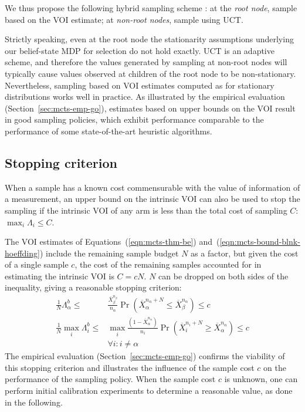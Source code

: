We thus propose the following hybrid sampling scheme \cite{TolpinShimony.mcts}: 
	at the \emph{root node}, sample based on the VOI estimate;
	at \emph{non-root nodes}, sample using UCT.

Strictly speaking, even at the root node the stationarity assumptions
underlying our belief-state MDP for selection do not hold exactly. UCT
is an adaptive scheme, and therefore the values generated by sampling
at non-root nodes will typically cause values observed at children of
the root node to be non-stationary.  Nevertheless, sampling based on
VOI estimates computed as for stationary distributions works well in
practice. As illustrated by the empirical evaluation
(Section~\ref{sec:mcts-emp-go}), estimates based on
upper bounds on the VOI result in good sampling policies, which
exhibit performance comparable to the performance of some
state-of-the-art heuristic algorithms.


\subsection{Stopping criterion}
\label{sec:mcts-control-stopping-criterion}

When a sample has a known cost commensurable with the value of
information of a measurement, an upper bound on the intrinsic VOI can also
be used to stop the sampling if the intrinsic VOI of any arm
is less than the total cost of sampling $C$: $\max_i \Lambda_i \le C$.

The VOI estimates of Equations~(\ref{eqn:mcts-thm-be}) and~(\ref{eqn:mcts-bound-blnk-hoeffding})
include the remaining sample budget $N$ as a
factor, but given the cost of a single sample $c$, the cost of the
remaining samples accounted for in estimating the intrinsic VOI is
$C=cN$. $N$ can be dropped on both sides of the inequality,
giving a reasonable stopping criterion:
\begin{align}
\frac 1 N \Lambda_\alpha^b \le&\frac {\overline X_\beta^{n_\beta}}
  {n_\alpha}\Pr(\overline X_\alpha^{n_\alpha+N}\le\overline
  X_\beta^{n_\alpha})\le c\nonumber\\
\frac 1 N \max_i\Lambda_i^b\le &\max_i\frac {(1-\overline X_\alpha^{n_\alpha})} {n_i}\Pr(\overline
  X_i^{n_i+N}\ge\overline X_\alpha^{n_\alpha})\le c\nonumber\\
    &\forall i: i\ne\alpha
\label{eqn:mcts-stopping-blnk}
\end{align}
The empirical evaluation (Section~\ref{sec:mcts-emp-go})
confirms the viability of this stopping criterion and illustrates the
influence of the sample cost $c$ on the performance of
the sampling policy. When the sample cost $c$ is unknown, one can perform initial calibration experiments
to determine a reasonable value, as done in the following.

